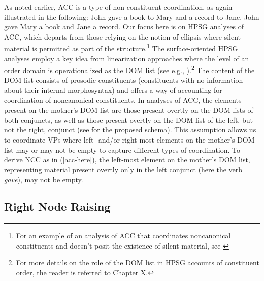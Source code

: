 \documentclass[output=paper
                ,modfonts
                ,nonflat
	        ,collection
	        ,collectionchapter
	        ,collectiontoclongg
 	        ,biblatex
                ,babelshorthands
                ,newtxmath
                ,draftmode
                ,colorlinks, citecolor=brown
]{./langsci/langscibook}
\begin{document}
As noted earlier, ACC is a type of non-constituent coordination, as again
illustrated in the following:
%
%
\ea John gave a book to Mary and a record to Jane.  \z \label{acc-here}
\ea John gave Mary a book and Jane a record.  \z
%
Our focus here is on HPSG analyses of ACC, which departs from those
relying on the notion of ellipsis where silent material is permitted as part of the structure.\footnote{For an example of an analysis of ACC that coordinates noncanonical constituents and doesn't posit the existence of silent material, see \citep{Mouret2006}} The surface-oriented HPSG analyses employ a key idea from linearization approaches
where the level of an order domain is operationalized as the DOM list (see e.g., \citealt{Beavers2004, Crysman2003, Yatabe2001}).\footnote{For more details on the role of the DOM list in HPSG accounts of constituent order, the reader is referred to Chapter X.} The content of the DOM list consists of prosodic constituents (constituents with no information about their internal morphosyntax) and offers a way of accounting for coordination of noncanonical constituents. In analyses of ACC, the elements present on the mother's DOM list are those present overtly on the DOM lists of both conjuncts, as well as those present overtly on the DOM list of the left, but not the right, conjunct (see \citealt[(27)]{Beavers2004} for the proposed schema).
%
%
%
%
%
%
This assumption allows us to coordinate VPs where left- and/or right-most elements on the mother's DOM list may or may not be empty to capture different types of coordination.
To derive NCC as in (\ref{acc-here}), the left-most element on the mother's DOM list, representing material present overtly only in the left conjunct (here the verb {\it gave}), may not be empty.
%


\subsection{Right Node Raising}
\end{document}
